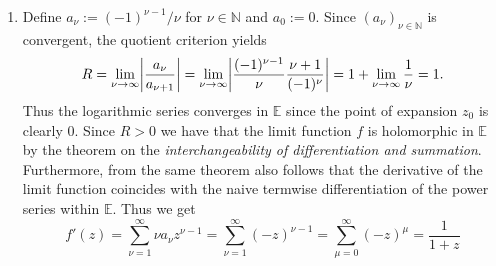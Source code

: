\begin{enumerate}[label = \textbf{Exercise \arabic*.},wide = 0pt, itemsep=1.5ex]
\begin{enumerate}[label = (\alph*),wide = 0pt, itemsep=1.5ex]
\begin{proof}
			\noindent we get
			\begin{equation}
				\cosh z = \cos(iz) = \sum_{\nu = 0}^\infty \frac{(-1)^\nu}{(2\nu)!}(iz)^{2\nu} = \sum_{\nu = 0}^\infty \frac{(-1)^{2\nu}}{(2\nu)!}z^{2\nu} = \sum_{\nu = 0}^\infty \frac{z^{2\nu}}{(2\nu)!}
			\end{equation}

			\noindent and
			\begin{equation}
				\sinh z = -i\sin(iz) = -i \sum_{\nu = 0}^\infty \frac{(-1)^{\nu}}{(2\nu + 1)!}(iz)^{2\nu + 1} = \sum_{\nu = 0}^\infty \frac{(-1)^{2\nu}}{(2\nu + 1)!}z^{2\nu + 1} = \sum_{\nu = 0}^\infty \frac{z^{2\nu + 1}}{(2\nu + 1)!}
			\end{equation}
			\noindent for all $z \in \mathbb{Z}$.
			\end{proof}
			\begin{remark}
				The power series given in lemma \ref{lem:pow_cosh} can be rewritten into the standard form
				\begin{equation}
					\sum_{\nu = 0}^\infty a_\nu (z - z_0)^\nu
				\end{equation}

				\noindent by considering apropriate sequences $(a_\nu)_{\nu \in \mathbb{N}_0}$. Also it is clearly seen that $z_0 = 0$ is the point of expansion.
			\end{remark}

		\item Define $a_\nu := (-1)^{\nu - 1}/\nu$ for $\nu \in \mathbb{N}$ and $a_0 := 0$. Since $(a_\nu)_{\nu \in \mathbb{N}}$ is convergent, the quotient criterion yields
			\begin{equation}
				R = \lim_{\nu \to \infty} \abs[3]{\frac{a_\nu}{a_{\nu + 1}}} = \lim_{\nu \to \infty}\abs[3]{\frac{(-1)^{\nu - 1}}{\nu} \frac{\nu + 1}{(-1)^{\nu}}} = 1 + \lim_{\nu \to \infty}\frac{1}{\nu} = 1. 
			\end{equation}
			Thus the logarithmic series converges in $\mathbb{E}$ since the point of expansion $z_0$ is clearly $0$. Since $R > 0$ we have that the limit function $f$ is holomorphic in $\mathbb{E}$ by the theorem on the \emph{interchangeability of differentiation and summation}. Furthermore, from the same theorem also follows that the derivative of the limit function coincides with the naive termwise differentiation of the power series within $\mathbb{E}$. Thus we get
			\begin{equation}
				f'(z) = \sum_{\nu = 1}^\infty \nu a_\nu z^{\nu-1} = \sum_{\nu = 1}^\infty (-z)^{\nu-1} = \sum_{\mu = 0}^\infty (-z)^\mu = \frac{1}{1 + z}
			\end{equation}


\end{enumerate}
\end{enumerate}
